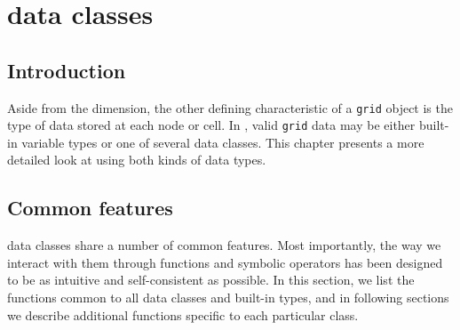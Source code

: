 
\chapter{\MMSP data classes}

\section{Introduction}
Aside from the dimension, the other defining characteristic of a {\tt grid} object is the type of data stored at each node or cell.  In \MMSP, valid {\tt grid} data may be either built-in variable types or one of several \MMSP data classes.  This chapter presents a more detailed look at using both kinds of data types.

\section{Common features}
\MMSP data classes share a number of common features.  Most importantly, the way we interact with them through functions and symbolic operators has been designed to be as intuitive and self-consistent as possible.  In this section, we list the functions common to all \MMSP data classes and built-in types, and in following sections we describe additional functions specific to each particular class.

